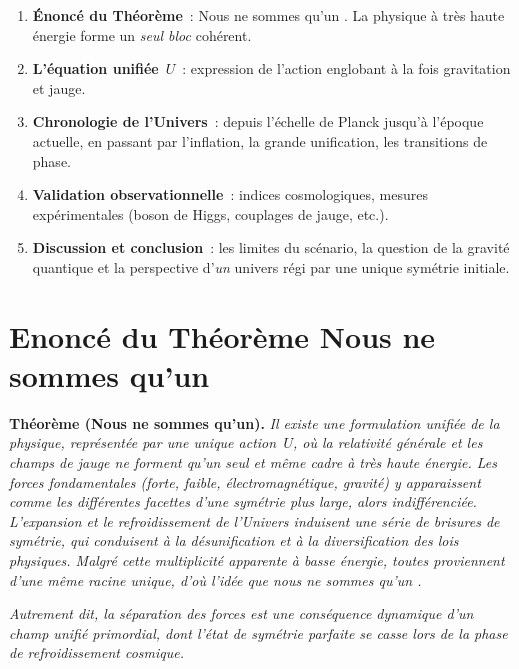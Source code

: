 \documentclass[12pt]{article}
\begin{document}
\begin{enumerate}
    \item[\S\ref{sec:theoreme}] \textbf{\'Enonc\'e du Th\'eor\`eme}~: \og Nous ne sommes qu'un \fg. 
          La physique \`a tr\`es haute \'energie forme un \emph{seul bloc} coh\'erent.
    \item[\S\ref{sec:actionU}] \textbf{L'\'equation unifi\'ee} \(\,U\)~: 
          expression de l'action englobant \`a la fois gravitation et jauge.
    \item[\S\ref{sec:chronologie}] \textbf{Chronologie de l'Univers}~: 
          depuis l'\'echelle de Planck jusqu'\`a l'\'epoque actuelle, 
          en passant par l'inflation, la grande unification, les transitions de phase.
    \item[\S\ref{sec:validation}] \textbf{Validation observationnelle}~: 
          indices cosmologiques, mesures exp\'erimentales (boson de Higgs, couplages de jauge, etc.).
    \item[\S\ref{sec:discussion}] \textbf{Discussion et conclusion}~: 
          les limites du sc\'enario, la question de la gravit\'e quantique et la perspective 
          d'\emph{un} univers r\'egi par une unique sym\'etrie initiale.
\end{enumerate}

\section{Enonc\'e du Th\'eor\`eme \og Nous ne sommes qu'un \fg}
\label{sec:theoreme}

\textbf{Th\'eor\`eme (Nous ne sommes qu'un).} 
\emph{Il existe une formulation unifi\'ee de la physique, repr\'esent\'ee par une unique action \(\,U\), 
o\`u la relativit\'e g\'en\'erale et les champs de jauge ne forment qu'un seul et m\^eme cadre \`a tr\`es haute \'energie. 
Les forces fondamentales (forte, faible, \'electromagn\'etique, gravit\'e) y apparaissent 
comme les diff\'erentes \og facettes \fg{} d'une sym\'etrie plus large, alors indiff\'erenci\'ee. 
L'expansion et le refroidissement de l'Univers induisent une s\'erie de \emph{brisures de sym\'etrie}, 
qui conduisent \`a la \og d\'esunification \fg{} et \`a la diversification des lois physiques. 
Malgr\'e cette multiplicité apparente \`a basse \'energie, toutes proviennent d'une m\^eme racine unique, 
d'o\`u l'id\'ee que \og nous ne sommes qu'un \fg.}

\begin{center}
\emph{Autrement dit, la s\'eparation des forces est une cons\'equence dynamique 
d'un \emph{champ unifi\'e primordial}, dont l'\'etat de sym\'etrie parfaite 
se \og casse \fg{} lors de la phase de refroidissement cosmique.}
\end{center}
\end{document}
